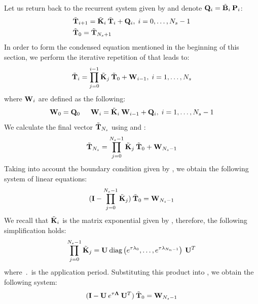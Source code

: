  \label{sec:ce-solution}
Let us return back to the recurrent system given by  and denote \mbox{$\mathbf{Q}_i = \tilde{\mathbf{B}}_i \: \mathbf{P}_i$}:
\begin{align}
  & \tilde{\mathbf{T}}_{i + 1} = \tilde{\mathbf{K}}_i \: \tilde{\mathbf{T}}_i + \mathbf{Q}_i, \; i = 0, \dots, N_s - 1 \label{eq:ce-recurrent} \\
  & \tilde{\mathbf{T}}_0 = \tilde{\mathbf{T}}_{N_s + 1} \nonumber
\end{align}
In order to form the condensed equation mentioned in the beginning of this section, we perform the iterative repetition of  that leads to:
\begin{equation} \label{eq:y-recurrent}
  \tilde{\mathbf{T}}_i = \prod_{j = 0}^{i - 1} \tilde{\mathbf{K}}_j \: \tilde{\mathbf{T}}_0 + \mathbf{W}_{i - 1}, \; i = 1, \dots, N_s
\end{equation}
where $\mathbf{W}_i$ are defined as the following:
\begin{equation}
  \mathbf{W}_0 = \mathbf{Q}_0 \hspace{15pt} \mathbf{W}_i = \tilde{\mathbf{K}}_i \: \mathbf{W}_{i - 1} + \mathbf{Q}_i, \; i = 1, \dots, N_s - 1 \label{eq:p-recurrent}
\end{equation}
We calculate the final vector $\tilde{\mathbf{T}}_{N_s}$ using  and :
\[
  \tilde{\mathbf{T}}_{N_s} = \prod_{j = 0}^{N_s - 1} \tilde{\mathbf{K}}_j \: \tilde{\mathbf{T}}_0 + \mathbf{W}_{N_s - 1}
\]
Taking into account the boundary condition given by , we obtain the following system of linear equations:
\begin{equation} \label{eq:core-system}
  (\mathbf{I} - \prod_{j = 0}^{N_s - 1} \tilde{\mathbf{K}}_j) \: \tilde{\mathbf{T}}_0 = \mathbf{W}_{N_s - 1}
\end{equation}
We recall that $\tilde{\mathbf{K}}_i$ is the matrix exponential given by , therefore, the following simplification holds:
\[
  \prod_{j = 0}^{N_s - 1} \tilde{\mathbf{K}}_j = \mathbf{U} \: \text{diag} \left( e^{\tau \lambda_0}, \dots, e^{\tau \lambda_{N_n - 1}} \right) \: \mathbf{U}^T
\]
where $\period$ is the application period. Substituting this product into , we obtain the following system:
\[
  (\mathbf{I} - \mathbf{U} \: e^{\tau \mathbf{\Lambda}} \: \mathbf{U}^T) \: \tilde{\mathbf{T}}_0 = \mathbf{W}_{N_s - 1}
\]
